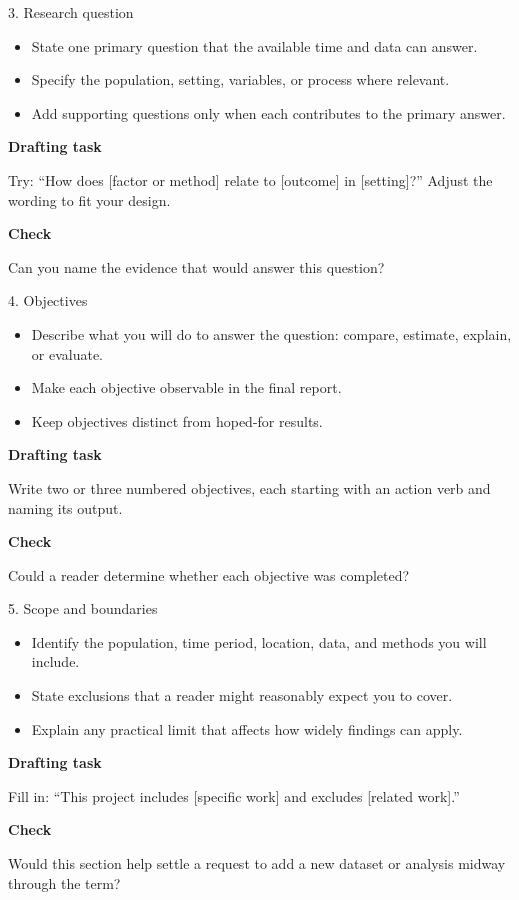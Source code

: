 \documentclass[aspectratio=43,11pt]{beamer}
\newcommand{\draft}[1]{\medskip\textbf{Drafting task}\par #1}
\newcommand{\checkit}[1]{\medskip\textbf{Check}\par #1}
\begin{document}
\begin{frame}{3. Research question}
  \begin{itemize}
    \item State one primary question that the available time and data can answer.
    \item Specify the population, setting, variables, or process where relevant.
    \item Add supporting questions only when each contributes to the primary answer.
  \end{itemize}
  
  \draft{Try: ``How does [factor or method] relate to [outcome] in [setting]?'' Adjust the wording to fit your design.}
  
  \checkit{Can you name the evidence that would answer this question?}
\end{frame}

\begin{frame}{4. Objectives}
  \begin{itemize}
    \item Describe what you will do to answer the question: compare, estimate, explain, or evaluate.
    \item Make each objective observable in the final report.
    \item Keep objectives distinct from hoped-for results.
  \end{itemize}
  
  \draft{Write two or three numbered objectives, each starting with an action verb and naming its output.}
  
  \checkit{Could a reader determine whether each objective was completed?}
\end{frame}

\begin{frame}{5. Scope and boundaries}
  \begin{itemize}
    \item Identify the population, time period, location, data, and methods you will include.
    \item State exclusions that a reader might reasonably expect you to cover.
    \item Explain any practical limit that affects how widely findings can apply.
  \end{itemize}
  
  \draft{Fill in: ``This project includes [specific work] and excludes [related work].''}
  
  \checkit{Would this section help settle a request to add a new dataset or analysis midway through the term?}
\end{frame}
\end{document}
